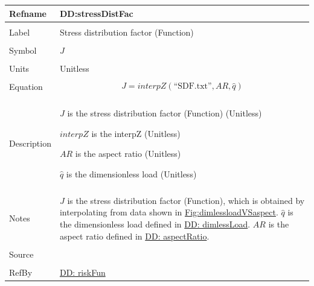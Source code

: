 \documentclass[12pt]{article}
\begin{document}
\noindent \begin{minipage}{\textwidth}
          \begin{tabular}{>{\raggedright}p{}>{\raggedright\arraybackslash}p{}}
          \toprule \textbf{Refname} & \textbf{DD:stressDistFac}
          \label{DD:stressDistFac}
          \\ \midrule \\
          Label & Stress distribution factor (Function)
          \\ \midrule \\
          Symbol & $J$
          \\ \midrule \\
          Units & Unitless
          \\ \midrule \\
          Equation & \begin{displaymath}
                     J=interpZ\left(\text{``SDF.txt''},AR,\hat{q}\right)
                     \end{displaymath}
          \\ \midrule \\
          Description & \begin{symbDescription}
                        \item{$J$ is the stress distribution factor (Function) (Unitless)}
                        \item{$interpZ$ is the interpZ (Unitless)}
                        \item{$AR$ is the aspect ratio (Unitless)}
                        \item{$\hat{q}$ is the dimensionless load (Unitless)}
                        \end{symbDescription}
          \\ \midrule \\
          Notes & $J$ is the stress distribution factor (Function), which is obtained by interpolating from data shown in \hyperref[Figure:dimlessloadVSaspect]{Fig:dimlessloadVSaspect}.
                  $\hat{q}$ is the dimensionless load defined in \hyperref[DD:dimlessLoad]{DD: dimlessLoad}.
                  $AR$ is the aspect ratio defined in \hyperref[DD:aspectRatio]{DD: aspectRatio}.
          \\ \midrule \\
          Source & \cite{astm2009}
          \\ \midrule \\
          RefBy & \hyperref[DD:riskFun]{DD: riskFun}
          \\ \bottomrule
          \end{tabular}
          \end{minipage}
\par~
\end{document}

